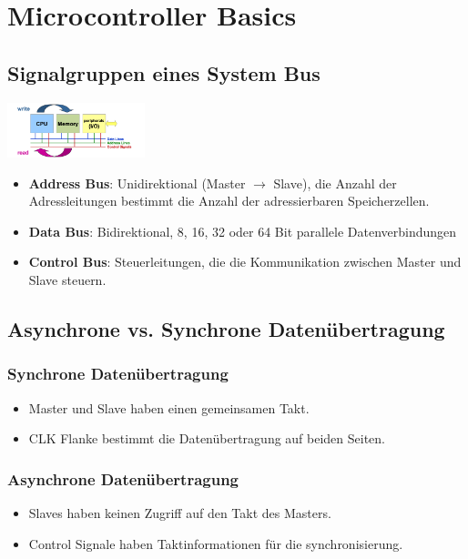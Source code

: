 \section{Microcontroller Basics}

\subsection{Signalgruppen eines System Bus}

\includegraphics[width=0.3\textwidth]{images/system_bus.png}

\begin{itemize}
    \item \textbf{Address Bus}: Unidirektional (Master $\rightarrow$ Slave), die Anzahl der Adressleitungen bestimmt die Anzahl der adressierbaren Speicherzellen.
    \item \textbf{Data Bus}: Bidirektional, 8, 16, 32 oder 64 Bit parallele Datenverbindungen
    \item \textbf{Control Bus}: Steuerleitungen, die die Kommunikation zwischen Master und Slave steuern.
\end{itemize}

\subsection{Asynchrone vs. Synchrone Datenübertragung}
\subsubsection{Synchrone Datenübertragung}
\begin{itemize}
    \item Master und Slave haben einen gemeinsamen Takt.
    \item CLK Flanke bestimmt die Datenübertragung auf beiden Seiten.
\end{itemize}
\subsubsection{Asynchrone Datenübertragung}
\begin{itemize}
    \item Slaves haben keinen Zugriff auf den Takt des Masters.
    \item Control Signale haben Taktinformationen für die synchronisierung.
\end{itemize}

